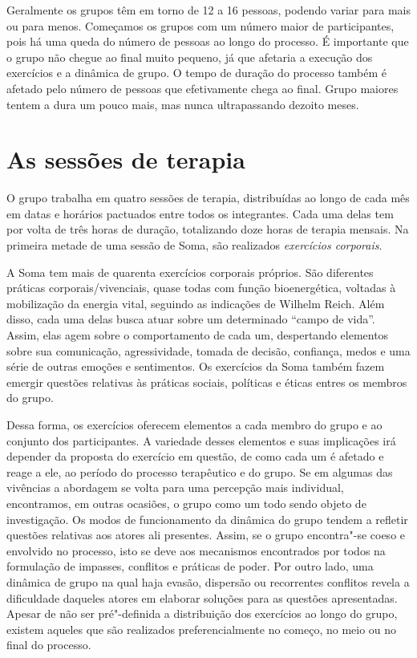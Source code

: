 Geralmente os grupos têm em torno de 12 a 16 pessoas, podendo variar
para mais ou para menos. Começamos os grupos com um número maior de
participantes, pois há uma queda do número de pessoas ao longo do
processo. É importante que o grupo não chegue ao final muito pequeno, já
que afetaria a execução dos exercícios e a dinâmica de grupo. O tempo de
duração do processo também é afetado pelo número de pessoas que
efetivamente chega ao final. Grupo maiores tentem a dura um pouco mais,
mas nunca ultrapassando dezoito meses.

\section{As sessões de terapia}

O grupo trabalha em quatro sessões de terapia, distribuídas ao longo de
cada mês em datas e horários pactuados entre todos os integrantes. Cada
uma delas tem por volta de três horas de duração, totalizando doze horas
de terapia mensais. Na primeira metade de uma sessão de Soma, são
realizados \emph{exercícios corporais}.

A Soma tem mais de quarenta exercícios corporais próprios. São
diferentes práticas corporais/vivenciais, quase todas com função
bioenergética, voltadas à mobilização da energia vital, seguindo as
indicações de Wilhelm Reich. Além disso, cada uma delas busca atuar
sobre um determinado ``campo de vida''. Assim, elas agem sobre o
comportamento de cada um, despertando elementos sobre sua comunicação,
agressividade, tomada de decisão, confiança, medos e uma série de outras
emoções e sentimentos. Os exercícios da Soma também fazem emergir
questões relativas às práticas sociais, políticas e éticas entres os
membros do grupo.

Dessa forma, os exercícios oferecem elementos a cada membro do grupo e
ao conjunto dos participantes. A variedade desses elementos e suas
implicações irá depender da proposta do exercício em questão, de como
cada um é afetado e reage a ele, ao período do processo terapêutico e do
grupo. Se em algumas das vivências a abordagem se volta para uma
percepção mais individual, encontramos, em outras ocasiões, o grupo como
um todo sendo objeto de investigação. Os modos de funcionamento da
dinâmica do grupo tendem a refletir questões relativas aos atores ali
presentes. Assim, se o grupo encontra"-se coeso e envolvido no processo,
isto se deve aos mecanismos encontrados por todos na formulação de
impasses, conflitos e práticas de poder. Por outro lado, uma dinâmica de
grupo na qual haja evasão, dispersão ou recorrentes conflitos revela a
dificuldade daqueles atores em elaborar soluções para as questões
apresentadas. Apesar de não ser pré"-definida a distribuição dos
exercícios ao longo do grupo, existem aqueles que são realizados
preferencialmente no começo, no meio ou no final do processo.

